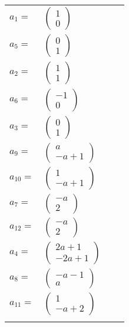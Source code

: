 \documentclass[1p]{elsarticle_modified}
\theoremstyle{definition}
\begin{document}
\begin{tabular}{m{7pt} m{180pt} m{7pt} m{180pt} }
\flushright $a_{1}=$&$\begin{pmatrix}1\\0\end{pmatrix}$ \\
\flushright $a_{5}=$&$\begin{pmatrix}0\\1\end{pmatrix}$ \\
\flushright $a_{2}=$&$\begin{pmatrix}1\\1\end{pmatrix}$ \\
\flushright $a_{6}=$&$\begin{pmatrix}-1\\0\end{pmatrix}$ \\
\flushright $a_{3}=$&$\begin{pmatrix}0\\1\end{pmatrix}$ \\
\flushright $a_{9}=$&$\begin{pmatrix}a\\- a+1\end{pmatrix}$ \\
\flushright $a_{10}=$&$\begin{pmatrix}1\\- a+1\end{pmatrix}$ \\
\flushright $a_{7}=$&$\begin{pmatrix}- a\\2\end{pmatrix}$ \\
\flushright $a_{12}=$&$\begin{pmatrix}- a\\2\end{pmatrix}$ \\
\flushright $a_{4}=$&$\begin{pmatrix}2 a+1\\-2 a+1\end{pmatrix}$ \\
\flushright $a_{8}=$&$\begin{pmatrix}- a-1\\a\end{pmatrix}$ \\
\flushright $a_{11}=$&$\begin{pmatrix}1\\- a+2\end{pmatrix}$\\&\end{tabular}
\end{document}
